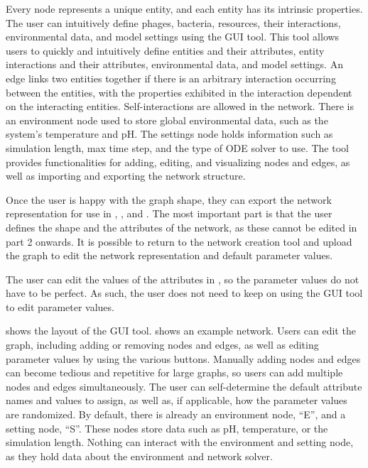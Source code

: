 Every node represents a unique entity, and each entity has its intrinsic properties. 
The user can intuitively define phages, bacteria, resources, their interactions, environmental data, and model settings using the GUI tool. 
This tool allows users to quickly and intuitively define entities and their attributes, entity interactions and their attributes, environmental data, and model settings.
An edge links two entities together if there is an arbitrary interaction occurring between the entities, with the properties exhibited in the interaction dependent on the interacting entities. 
Self-interactions are allowed in the network. 
There is an environment node used to store global environmental data, such as the system’s temperature and pH.
The settings node holds information such as simulation length, max time step, and the type of ODE solver to use.
The tool provides functionalities for adding, editing, and visualizing nodes and edges, as well as importing and exporting the network structure.  

Once the user is happy with the graph shape, they can export the network representation for use in , , and . 
The most important part is that the user defines the shape and the attributes of the network, as these cannot be edited in part 2 onwards. 
It is possible to return to the network creation tool and upload the graph to edit the network representation and default parameter values. 

The user can edit the values of the attributes in , so the parameter values do not have to be perfect. 
As such, the user does not need to keep on using the GUI tool to edit parameter values. 

 shows the layout of the GUI tool.  shows an example network. 
Users can edit the graph, including adding or removing nodes and edges, as well as editing parameter values by using the various buttons. 
Manually adding nodes and edges can become tedious and repetitive for large graphs, so users can add multiple nodes and edges simultaneously.
The user can self-determine the default attribute names and values to assign, as well as, if applicable, how the parameter values are randomized. 
By default, there is already an environment node, “E”, and a setting node, “S”.  
These nodes store data such as pH, temperature, or the simulation length.
Nothing can interact with the environment and setting node, as they hold data about the environment and network solver.

